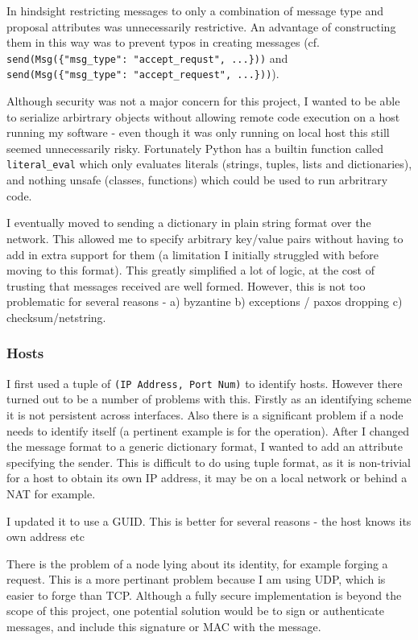 \documentclass[12pt,twoside,notitlepage]{report}
\begin{document}
In hindsight restricting messages to only a combination of message type and proposal attributes
was unnecessarily restrictive. An advantage of constructing them in this way was to prevent typos
in creating messages (cf. \verb+send(Msg({"msg_type": "accept_requst", ...}))+
and \verb+send(Msg({"msg_type": "accept_request", ...}))+).

Although security was not a major concern for this project, I wanted to be able to serialize
arbirtrary objects without allowing remote code execution on a host running my software - even
though it was only running on local host this still seemed unnecessarily risky. Fortunately Python
has a builtin function called \verb+literal_eval+ which only evaluates literals (strings, tuples,
lists and dictionaries), and nothing unsafe (classes, functions) which could be used to run
arbritrary code.

I eventually moved to sending a dictionary in plain string format over the network. This allowed
me to specify arbitrary key/value pairs without having to add in extra support for them (a
limitation I initially struggled with before moving to this format). This greatly simplified a lot
of logic, at the cost of trusting that messages received are well formed. However, this is not too
problematic for several reasons - a) byzantine b) exceptions / paxos dropping c)
checksum/netstring.

\subsubsection*{Hosts}

I first used a tuple of \verb+(IP Address, Port Num)+ to identify hosts. However there turned out
to be a number of problems with this. Firstly as an identifying scheme it is not persistent across
interfaces. Also there is a significant problem if a node needs to identify itself (a pertinent
example is for the  operation). After I changed the message format to a generic
dictionary format, I wanted to add an attribute specifying the sender. This is difficult to do
using tuple format, as it is non-trivial for a host to obtain its own IP address, it may be on a
local network or behind a NAT for example.

I updated it to use a GUID. This is better for several reasons - the host knows its own address
etc

There is the problem of a node lying about its identity, for example forging a 
request. This is a more pertinant problem because I am using UDP, which is easier to forge than
TCP. Although a fully secure implementation is beyond the scope of this project, one potential
solution would be to sign or authenticate messages, and include this signature or MAC with the
message.
\end{document}
